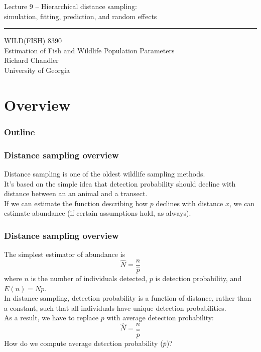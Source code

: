 \documentclass[color=usenames,dvipsnames]{beamer}\usepackage[]{graphicx}\usepackage[]{color}
\begin{document}
\begin{frame}[plain]
  \LARGE
  \centering
  {
    \LARGE Lecture 9 -- Hierarchical distance sampling: \\
    \Large simulation, fitting, prediction, and random effects \\
  }
  {\color{default} \rule{\textwidth}{0.1pt} }
  \vfill
  \large
  WILD(FISH) 8390 \\
  Estimation of Fish and Wildlife Population Parameters \\
  \vfill
  \large
  Richard Chandler \\
  University of Georgia \\
\end{frame}






\section{Overview}



\begin{frame}[plain]
  \frametitle{Outline}
  \Large
\end{frame}



\begin{frame}
  \frametitle{Distance sampling overview}
  Distance sampling is one of the oldest wildlife sampling methods. \\
  \pause
  \vfill
  It's based on the simple idea that detection probability should
  decline with distance between an an animal and a transect. \\
  \pause
  \vfill
  If we can estimate the function describing how $p$ declines with
  distance $x$, we can estimate abundance \pause (if certain assumptions
  hold, as always). \\
\end{frame}



\begin{frame}
  \frametitle{Distance sampling overview}
  The simplest estimator of abundance is 
  \[
    \hat{N} = \frac{n}{\hat{p}}
  \]
  where $n$ is the number of individuals detected, $p$ is detection
  probability, and $E(n)=Np$. \\
  \pause
  \vfill
  In distance sampling, detection probability is a \alert{function} of
  distance, rather than a constant, such that all individuals have
  unique detection probabilities. \\
  \pause
  \vfill
  As a result, we have to replace
  $p$ with \alert{average} detection probability:
  \[
    \hat{N} = \frac{n}{\hat{\bar{p}}}
  \]
  \pause
  \vfill
  How do we compute average detection probability ($\bar{p}$)?
\end{frame}
\end{document}
